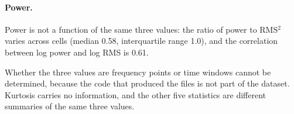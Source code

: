 \paragraph{Power.} Power is not a function of the same three values: the ratio of power to RMS$^2$ varies across cells (median 0.58, interquartile range 1.0), and the correlation between log power and log RMS is 0.61.

Whether the three values are frequency points or time windows cannot be determined, because the code that produced the files is not part of the dataset. Kurtosis carries no information, and the other five statistics are different summaries of the same three values.
